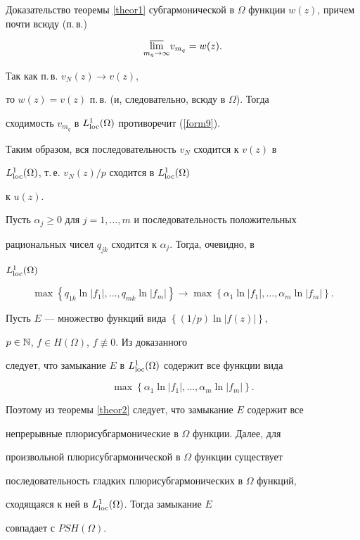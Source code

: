 \begin{pf*}{Доказательство теоремы \ref{theor1}}
субгармонической в $\Omega$ функции $w(z)$, причем почти всюду (п.\,в.)


$$


\underset{m_q\to\infty}{\varlimsup}{} v_{m_q}=w(z).


$$ 


Так как п.\,в. $v_N(z)\to v(z)$,


то $w(z)=v(z)$ п.\,в. (и, следовательно, всюду в $\Omega$). Тогда 


сходимость $v_{m_q}$ в $L^1_{\operatorname{loc}}(\Omega)$ противоречит (\ref{form9}). 


Таким образом, вся последовательность $v_N$ сходится к $v(z)$ в 


$L^1_{\operatorname{loc}}(\Omega)$, т.\,е. $v_N(z)/p$ сходится в $L^1_{\operatorname{loc}}(\Omega)$


к $u(z)$. 





Пусть $\alpha_j\ge 0$ для $j=1,\dotsc,m$ и последовательность положительных 


рациональных чисел $q_{jk}$ сходится к $\alpha_j$. Тогда, очевидно, в 


$L^1_{\operatorname{loc}}(\Omega)$


$$


\max\left\{q_{1k}\ln|f_1|,\dotsc,q_{mk}\ln|f_m|\right\}\to 


\max\left\{\alpha_1\ln|f_1|,\dotsc,\alpha_m\ln|f_m|\right\}.


$$





Пусть $E$ --- множество функций вида $\left\{(1/p)\ln|f(z)|\right\}$,


$p\in \Bbb N$, $f\in H(\Omega)$, $f\not\equiv 0$. Из доказанного 


следует, что замыкание $E$ в $L^1_{\operatorname{loc}}(\Omega)$ содержит все функции вида


$$


\max\left\{\alpha_1\ln|f_1|,\dotsc,\alpha_m\ln|f_m|\right\}.


$$


Поэтому из теоремы \ref{theor2} следует, что замыкание $E$ содержит все 


непрерывные плюрисубгармонические в $\Omega$ функции. Далее, для 


произвольной плюрисубгармонической в $\Omega$ функции существует


последовательность гладких плюрисубгармонических в $\Omega$ функций, 


сходящаяся к ней в $L^1_{\operatorname{loc}}(\Omega)$. Тогда замыкание $E$


совпадает с $PSH(\Omega)$.


\end{pf*}





